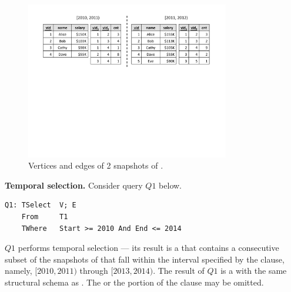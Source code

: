 \begin{figure}
\includegraphics[width=3.5in]{figs/2VE.pdf}
\caption{Vertices and edges of 2 snapshots of .}
\label{fig:2ve}
\end{figure}


{\bf Temporal selection.}  Consider query $Q1$ below.  

\begin{verbatim}
Q1: TSelect  V; E
    From     T1
    TWhere   Start >= 2010 And End <= 2014
\end{verbatim}

$Q1$ performs temporal selection --- its result is a \tg that contains
a consecutive subset of the snapshots of  that fall within
the interval specified by the  clause, namely, $[2010,
  2011)$ through $[2013, 2014)$.  The result of $Q1$ is a \tg with the
    same structural schema as . The  or the
     portion of the  clause may be
    omitted. 

